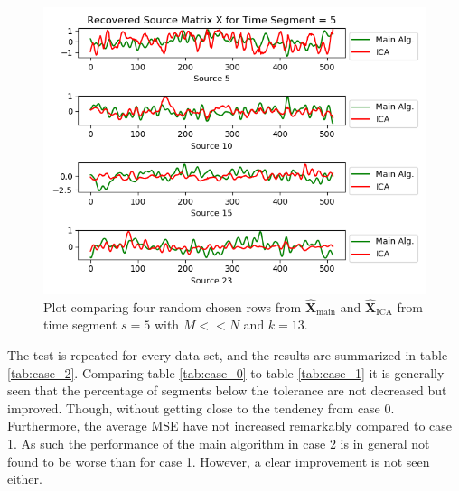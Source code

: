 \begin{figure}[H]
\begin{widepage}
\begin{minipage}[t]{.49\textwidth}
\includegraphics[width=1\linewidth]{figures/ch_7/resultat/EEG_second_removed_scaled_timeseg5S1_CClean.png}
\caption{Plot comparing four random chosen rows from $\hat{\mathbf{X}}_{\text{main}}$ and $\hat{\mathbf{X}}_{\text{ICA}}$ from time segment $s = 5$ with $M << N$ and $k=13$.}
	\label{fig:M<<N_3}
    \end{minipage}
\end{widepage}
\end{figure}
\noindent
The test is repeated for every data set, and the results are summarized in table \ref{tab:case_2}. Comparing table \ref{tab:case_0} to table \ref{tab:case_1} it is generally seen that the percentage of segments below the tolerance are not decreased but improved.
Though, without getting close to the tendency from case 0. 
Furthermore, the average MSE have not increased remarkably compared to case 1. 
As such the performance of the main algorithm in case 2 is in general not found to be worse than for case 1.
However, a clear improvement is not seen either.  
